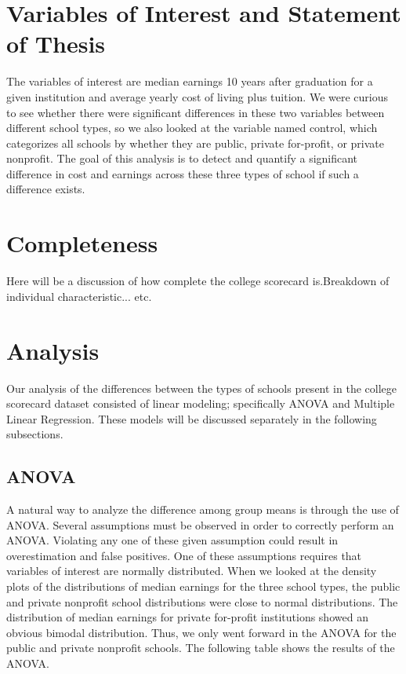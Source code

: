 \documentclass[%
 reprint,
 amsmath,amssymb,
 aps,
]{revtex4-1}
\begin{document}
\section{\label{sec:level1}Variables of Interest and Statement of Thesis}
The variables of interest are median earnings 10 years after graduation for a given institution and average yearly cost of living plus tuition.  We were curious to see whether there were significant differences in these two variables between different school types, so we also looked at the variable named control, which categorizes all schools by whether they are public, private for-profit, or private nonprofit. The goal of this analysis is to detect and quantify a significant difference in cost and earnings across these three types of school if such a difference exists.  

\section{\label{sec:level1}Completeness}
Here will be a discussion of how complete the college scorecard is.Breakdown of individual characteristic... etc. 

\section{\label{sec:level1}Analysis}
Our analysis of the differences between the types of schools present in the college scorecard dataset consisted of linear modeling; specifically ANOVA and Multiple Linear Regression.  These models will be discussed separately in the following subsections. 

\subsection{\label{sec:level2}ANOVA}
A natural way to analyze the difference among group means is through the use of ANOVA.  Several assumptions must be observed in order to correctly perform an ANOVA.  Violating any one of these given assumption could result in overestimation and false positives.  One of these assumptions requires that variables of interest are normally distributed.  When we looked at the density plots of the distributions of median earnings for the three school types, the public and private nonprofit school distributions were close to normal distributions.  The distribution of median earnings for private for-profit institutions showed an obvious bimodal distribution.  Thus, we only went forward in the ANOVA for the public and private nonprofit schools.  The following table shows the results of the ANOVA.
\end{document}
